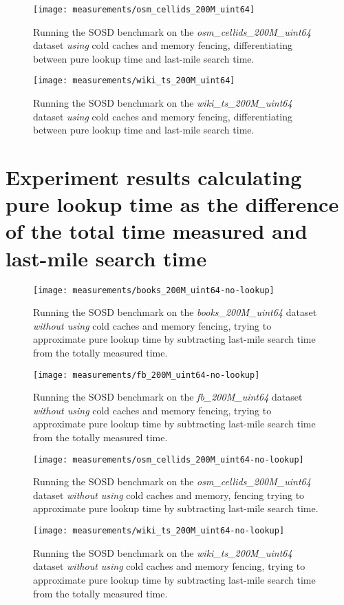 \begin{figure}[!htb]
  \centering
  \texttt{[image: measurements/osm\_cellids\_200M\_uint64]}
  \caption*{
    Running the SOSD benchmark on the \emph{osm\_cellids\_200M\_uint64} dataset \emph{using} cold caches and memory fencing, differentiating between pure lookup time and last-mile search time.
  }
\end{figure}

\begin{figure}[!htb]
  \centering
  \texttt{[image: measurements/wiki\_ts\_200M\_uint64]}
  \caption*{
    Running the SOSD benchmark on the \emph{wiki\_ts\_200M\_uint64} dataset \emph{using} cold caches and memory fencing, differentiating between pure lookup time and last-mile search time.
  }
\end{figure}

\newpage %

\section{Experiment results calculating pure lookup time as the difference of the total time measured and last-mile search time}
\label{sect:appendix:measurements-no-lookup}

\captionsetup[figure]{skip=10pt} %
\begin{figure}[!htb]
  \centering
  \texttt{[image: measurements/books\_200M\_uint64-no-lookup]}
  \caption*{
    Running the SOSD benchmark on the \emph{books\_200M\_uint64} dataset \emph{without using} cold caches and memory fencing, trying to approximate pure lookup time by subtracting last-mile search time from the totally measured time.
  }
\end{figure}

\begin{figure}[!htb]
  \centering
  \texttt{[image: measurements/fb\_200M\_uint64-no-lookup]}
  \caption*{
    Running the SOSD benchmark on the \emph{fb\_200M\_uint64} dataset \emph{without using} cold caches and memory fencing, trying to approximate pure lookup time by subtracting last-mile search time from the totally measured time.
  }
\end{figure}

\begin{figure}[!htb]
  \centering
  \texttt{[image: measurements/osm\_cellids\_200M\_uint64-no-lookup]}
  \caption*{
    Running the SOSD benchmark on the \emph{osm\_cellids\_200M\_uint64} dataset \emph{without using} cold caches and memory, fencing trying to approximate pure lookup time by subtracting last-mile search time.
  }
\end{figure}

\begin{figure}[!htb]
  \centering
  \texttt{[image: measurements/wiki\_ts\_200M\_uint64-no-lookup]}
  \caption*{
    Running the SOSD benchmark on the \emph{wiki\_ts\_200M\_uint64} dataset \emph{without using} cold caches and memory fencing, trying to approximate pure lookup time by subtracting last-mile search time from the totally measured time.
  }
\end{figure}
